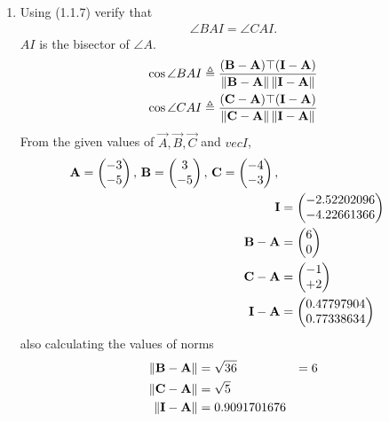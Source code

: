 \documentclass[11pt]{book}
\begin{document}
\begin{enumerate}[label=\thesection.\arabic*.,ref=\thesection.\theenumi]
  
\item Using (1.1.7) verify that 
\begin{align}
\angle BAI = \angle CAI.
\end{align}
$AI$ is the bisector of $\angle A$. \\
\solution
\begin{align}
\label{eq:1.5.5.2}
\cos{\angle BAI} \triangleq \frac{(\vec{B}-\vec{A})\top(\vec{I}-\vec{A})}{\norm{\vec{B}-\vec{A}}\norm{\vec{I}-\vec{A}}} \\
\cos{\angle CAI} \triangleq \frac{(\vec{C}-\vec{A})\top(\vec{I}-\vec{A})}{\norm{\vec{C}-\vec{A}}\norm{\vec{I}-\vec{A}}} 
\end{align}
From the given values of $\vec{A},\vec{B},\vec{C}$ and $vec{I}$,\\
\begin{align}
    \mathbf{A}=\begin{pmatrix}-3 \\ -5\end{pmatrix},\,
\mathbf{B}=\begin{pmatrix}3\\-5\end{pmatrix},\,
	\mathbf{C}=\begin{pmatrix}-4\\-3\end{pmatrix},\, \\
 \mathbf{I} &= \begin{pmatrix}-2.52202096 \\ -4.22661366\end{pmatrix} \\
	\mathbf{B}-\mathbf{A} &=\begin{pmatrix}6\\0\end{pmatrix} \\
	\mathbf{C}-\mathbf{A}&= \begin{pmatrix}-1\\+2\end{pmatrix} \\
 \mathbf{I}-\mathbf{A}  &=\begin{pmatrix}0.47797904 \\ 0.77338634\end{pmatrix}
\end{align}
also calculating the values of norms
\begin{align}
	\left\lVert\mathbf{B}-\mathbf{A}\right\rVert &= \sqrt{36} &= 6\\
	\left\lVert\mathbf{C}-\mathbf{A}\right\rVert &= \sqrt{5} \\
 	\left\lVert\mathbf{I}-\mathbf{A}\right\rVert &= 0.9091701676 \\
\end{align}



\end{enumerate}
\end{document}

